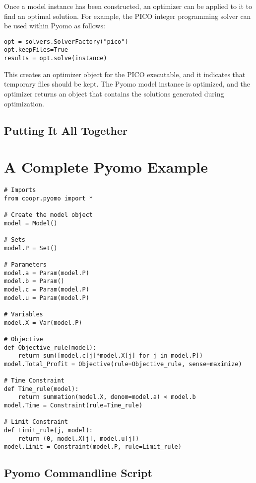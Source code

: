 Once a model instance has been constructed, an optimizer can be applied to it to find an optimal solution.  For example, the PICO integer programming solver can be used within Pyomo as follows:
\begin{lstlisting}
opt = solvers.SolverFactory("pico")
opt.keepFiles=True
results = opt.solve(instance)
\end{lstlisting}
This creates an optimizer object for the PICO executable, and it indicates that temporary files should be kept.  The Pyomo model instance is optimized, and the optimizer returns an object that contains the solutions generated during optimization.


\subsection{Putting It All Together}

\newpage
\section{A Complete Pyomo Example}
\label{sec:simple}

\begin{lstlisting}
# Imports
from coopr.pyomo import *

# Create the model object
model = Model()

# Sets
model.P = Set()

# Parameters
model.a = Param(model.P)
model.b = Param()
model.c = Param(model.P)
model.u = Param(model.P)

# Variables
model.X = Var(model.P)

# Objective
def Objective_rule(model):
    return sum([model.c[j]*model.X[j] for j in model.P])
model.Total_Profit = Objective(rule=Objective_rule, sense=maximize)

# Time Constraint
def Time_rule(model):
    return summation(model.X, denom=model.a) < model.b
model.Time = Constraint(rule=Time_rule)

# Limit Constraint
def Limit_rule(j, model):
    return (0, model.X[j], model.u[j])
model.Limit = Constraint(model.P, rule=Limit_rule)
\end{lstlisting}



\subsection{Pyomo Commandline Script}
\label{sec:script}


